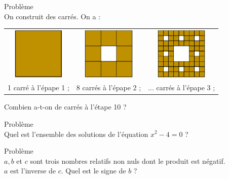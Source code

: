 \documentclass[a4paper, landscape,11pt,exos]{nsi} %
\newcounter{pbNum}
\newcommand{\pb}[1]
{
	\addtocounter{pbNum}{1}
	{\titlefont\color{UGLiBlue}\Large Problème\ \thepbNum\ \normalsize{#1}}\smallskip	
}
\begin{document}
\begin{multicols}{2}
    \pb{}\\
    On construit des carrés. On a :\\[.5em]
    \begin{tabular}{c c c}
        \includegraphics[width=2.5cm]{carre1} & \includegraphics[width=2.5cm]{carre2} & \includegraphics[width=2.5cm]{carre3}\\
        1 carré à l'épape 1 ; & 8 carrés à l'épape 2 ; & ... carrés à l'épape 3 ;\\
    \end{tabular}
    \vspace{.1cm}

    Combien a-t-on de carrés à l'étape 10 ?\\


    \newpage

    \maketitle
    
    \pb{}\\
    Quel est l’ensemble des solutions de l’équation $x^2-4=0$ ?\\
    \vfill\null
    \columnbreak
    

    \maketitle

    \pb{}\\
    $a, b$ et $c$ sont trois nombres relatifs non nuls dont le produit est négatif.\\
    $a$ est l’inverse de $c$. Quel est le signe de $b$ ?\\


\end{multicols}
\end{document}
